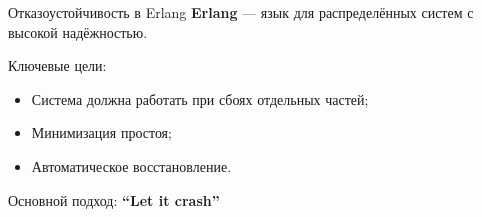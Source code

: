 \begin{frame}{Отказоустойчивость в Erlang}
	\textbf{Erlang} — язык для распределённых систем с высокой надёжностью.
	
	\vspace{0.5em}
	Ключевые цели:
	\begin{itemize}
		\item Система должна работать при сбоях отдельных частей;
		\item Минимизация простоя;
		\item Автоматическое восстановление.
	\end{itemize}
	
	\vspace{0.5em}
	Основной подход: \textbf{“Let it crash”}
\end{frame}